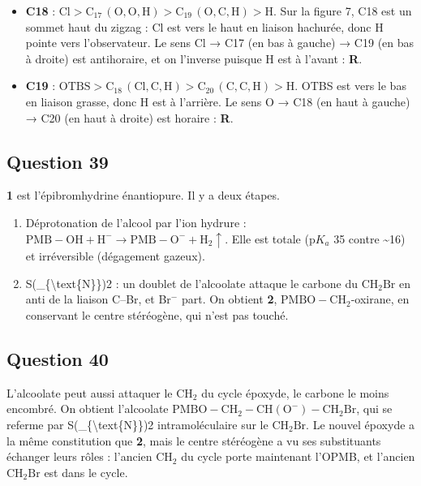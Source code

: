 \documentclass[11pt,a4paper]{article}
\providecommand{\tightlist}{\setlength{\itemsep}{0pt}\setlength{\parskip}{0pt}}
\newcommand{\equationajustee}[1]{%
  \sbox{\boiteequation}{$\displaystyle #1$}%
  \ifdim\wd\boiteequation>\linewidth
    \[\resizebox{\linewidth}{!}{\usebox{\boiteequation}}\]%
  \else
    \[#1\]%
  \fi}
\begin{document}
\begin{itemize}
\tightlist
\item
  \textbf{C18} : \(\mathrm{Cl}>\mathrm{C_{17}}\,(\mathrm{O,O,H})>\mathrm{C_{19}}\,(\mathrm{O,C,H})>\mathrm{H}\). Sur la figure 7, C18 est un sommet haut du zigzag : Cl est vers le haut en liaison hachurée, donc H pointe vers l'observateur. Le sens Cl → C17 (en bas à gauche) → C19 (en bas à droite) est antihoraire, et on l'inverse puisque H est à l'avant : \textbf{R}.
\item
  \textbf{C19} : \(\mathrm{OTBS}>\mathrm{C_{18}}\,(\mathrm{Cl,C,H})>\mathrm{C_{20}}\,(\mathrm{C,C,H})>\mathrm{H}\). OTBS est vers le bas en liaison grasse, donc H est à l'arrière. Le sens O → C18 (en haut à gauche) → C20 (en haut à droite) est horaire : \textbf{R}.
\end{itemize}

\equationajustee{\boxed{\text{C18 : }R,\qquad\text{C19 : }R\qquad(\text{double liaison C20=C21 }E)}}

\hypertarget{question-39}{%
\subsection{Question 39}\label{question-39}}

\textbf{1} est l'épibromhydrine énantiopure. Il y a deux étapes.

\begin{enumerate}
\def\labelenumi{\arabic{enumi}.}
\tightlist
\item
  Déprotonation de l'alcool par l'ion hydrure : \(\mathrm{PMB{-}OH}+\mathrm{H^-}\rightarrow\mathrm{PMB{-}O^-}+\mathrm{H_2}\uparrow\). Elle est totale (p\(K_a\) 35 contre \textasciitilde16) et irréversible (dégagement gazeux).
\item
  S(\_\{\textbackslash text\{N\}\})2 : un doublet de l'alcoolate attaque le carbone du \(\mathrm{CH_2Br}\) en anti de la liaison C--Br, et Br\(^-\) part. On obtient \textbf{2}, \(\mathrm{PMBO{-}CH_2}\)-oxirane, en conservant le centre stéréogène, qui n'est pas touché.
\end{enumerate}

\hypertarget{question-40}{%
\subsection{Question 40}\label{question-40}}

L'alcoolate peut aussi attaquer le \(\mathrm{CH_2}\) du cycle époxyde, le carbone le moins encombré. On obtient l'alcoolate \(\mathrm{PMBO{-}CH_2{-}CH(O^-){-}CH_2Br}\), qui se referme par S(\_\{\textbackslash text\{N\}\})2 intramoléculaire sur le \(\mathrm{CH_2Br}\). Le nouvel époxyde a la même constitution que \textbf{2}, mais le centre stéréogène a vu ses substituants échanger leurs rôles : l'ancien \(\mathrm{CH_2}\) du cycle porte maintenant l'OPMB, et l'ancien \(\mathrm{CH_2Br}\) est dans le cycle.
\end{document}
